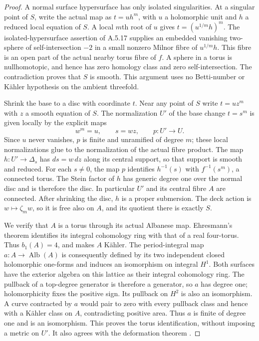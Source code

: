 \begin{proof}
A normal surface hypersurface has only isolated
singularities. At a singular point of $S$, write the
actual map as $t=u h^m$, with $u$ a holomorphic unit
and $h$ a reduced local equation of $S$. A local
$m$th root of $u$ gives $t=(u^{1/m}h)^m$. The
isolated-hypersurface assertion of A.5.17 supplies an
embedded vanishing two-sphere of self-intersection
$-2$ in a small nonzero Milnor fibre of $u^{1/m}h$.
This fibre is an open part of the actual nearby
torus fibre of $f$. A sphere in a torus is nullhomotopic,
and hence has zero homology class and zero
self-intersection. The contradiction proves that $S$
is smooth. This argument uses no Betti-number or
K\"ahler hypothesis on the ambient threefold.

Shrink the base to a disc with coordinate $t$. Near
any point of $S$ write $t=u z^m$ with $z$ a smooth
equation of $S$. The normalization $U'$ of the base
change $t=s^m$ is given locally by the explicit maps
\[
        w^m=u,\qquad s=wz,
        \qquad p:U'\longrightarrow U.
 \tag{C.UNN.1}
\]
Since $u$ never vanishes, $p$ is finite and unramified
of degree $m$; these local normalizations glue to the
normalization of the actual fibre product. The map
$h:U'\to\Delta_s$ has $ds=w\,dz$ along its central
support, so that support is smooth and reduced.
For each $s\ne0$, the map $p$ identifies $h^{-1}(s)$
with $f^{-1}(s^m)$, a connected torus. The Stein
factor of $h$ has generic degree one over the normal
disc and is therefore the disc. In particular $U'$
and its central fibre $A$ are connected. After
shrinking the disc, $h$ is a proper submersion.
The deck action is $w\mapsto\zeta_m w$, so it is
free also on $A$, and its quotient there is exactly
$S$.

We verify that $A$ is a torus through its actual
Albanese map. Ehresmann's theorem identifies its
integral cohomology ring with that of a real
four-torus. Thus $b_1(A)=4$, and
\cite[Theorem~11]{Buchdahl1999} makes $A$ K\"ahler.
The period-integral map
$a:A\to\operatorname{Alb}(A)$ is consequently
defined by its two independent closed holomorphic
one-forms and induces an isomorphism on integral
$H^1$. Both surfaces have the exterior algebra on
this lattice as their integral cohomology ring.
The pullback of a top-degree generator is therefore
a generator, so $a$ has degree one; holomorphicity
fixes the positive sign. Its pullback on $H^2$ is
also an isomorphism. A curve contracted by $a$
would pair to zero with every pullback class and
hence with a K\"ahler class on $A$, contradicting
positive area. Thus $a$ is finite of degree one
and is an isomorphism. This proves the torus
identification, without imposing a metric on $U'$.
It also agrees with the deformation theorem
\cite[Theorem~4.6]{Catanese2002}.


\end{proof}

